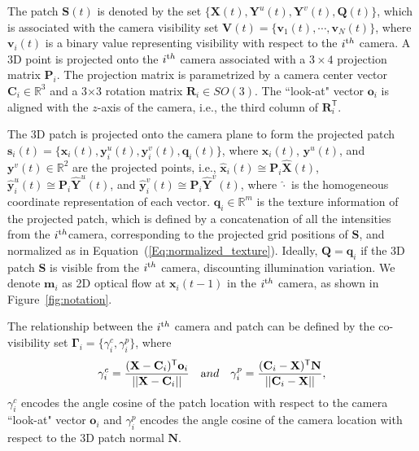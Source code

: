 The patch $\mathbf{S}(t)$ is denoted by the set $\{\mathbf{X}(t), \mathbf{Y}^u(t), \mathbf{Y}^v(t),\mathbf{Q}(t)\}$, which is associated with the camera visibility set $\mathbf{V}(t) = \{\mathbf{v}_1(t),\cdots,\mathbf{v}_N(t)\}$, where $\mathbf{v}_i(t)$ is a binary value representing visibility with respect to  the $i^{\textrm th}$ camera. %
A 3D point is projected onto the $i^{\textrm th}$ camera associated with a $3\times4$ projection matrix $\mathbf{P}_i$. The projection matrix is parametrized by a camera center vector $\mathbf{C}_i \in \mathds{R}^3$ and a 3$\times$3 rotation matrix $\mathbf{R}_i \in SO(3)$. The ``look-at" vector $\mathbf{o}_i$ is aligned with the $z$-axis of the camera, i.e., the third column of $\mathbf{R}_i^\mathsf{T}$. 

The 3D patch is projected onto the camera plane to form the projected patch $\mathbf{s}_i(t) = \{\mathbf{x}_i(t), \mathbf{y}_i^u(t), \mathbf{y}_i^v(t), \mathbf{q}_i(t) \}$, where $\mathbf{x}_i(t)$, $\mathbf{y}^u(t)$, and $\mathbf{y}^v(t) \in \mathds{R}^2$ are the projected points, i.e., $\widehat{\mathbf{x}}_i(t) \cong \mathbf{P}_i \widehat{\mathbf{X}}(t)$, $\widehat{\mathbf{y}}_i^u(t) \cong \mathbf{P}_i \widehat{\mathbf{Y}}^u(t)$, and $\widehat{\mathbf{y}}_i^v(t) \cong \mathbf{P}_i \widehat{\mathbf{Y}}^v(t)$, where $\widehat{\cdot}$ is the homogeneous coordinate representation of each vector. $\mathbf{q}_i  \in \mathds{R}^m$ is the texture information of the projected patch, which is defined by a concatenation of all the intensities from the $i^{\textrm th}$camera, corresponding to the projected grid positions of $\mathbf{S}$, and normalized as in Equation~(\ref{Eq:normalized_texture}). Ideally, $\mathbf{Q}=\mathbf{q}_i$ if the 3D patch $\mathbf{S}$ is visible from the $i^{\textrm th}$ camera, discounting illumination variation. We denote $\mathbf{m}_i$ as 2D optical flow at $\mathbf{x}_i(t-1)$ in the $i^{\textrm th}$ camera, as shown in Figure~\ref{fig:notation}. 

The relationship between the $i^{\textrm th}$ camera and patch can be defined by the co-visibility set $\mathbf{\Gamma}_i = \{\gamma^c_i, \gamma^p_i\}$, where
\begin{eqnarray}
\gamma^c_i = \frac{ (\mathbf{X}-\mathbf{C}_i)^\mathsf{T}\mathbf{o}_i} { || \mathbf{X}-\mathbf{C}_i || }~~~{\textrm and}~~~\gamma^p_i = \frac{ (\mathbf{C}_i - \mathbf{X})^\mathsf{T}\mathbf{N}} { || \mathbf{C}_i - \mathbf{X} || }, \nonumber
\end{eqnarray}
$\gamma^c_i$ encodes the angle cosine of the patch location with respect to the camera ``look-at" vector $\mathbf{o}_i$ and $\gamma^p_i$ encodes the angle cosine of the camera location with respect to the 3D patch normal $\mathbf{N}$.

